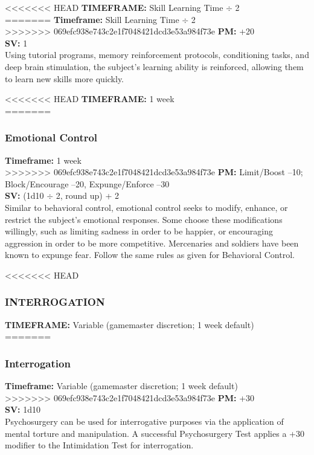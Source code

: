 <<<<<<< HEAD  \textbf{TIMEFRAME:} Skill Learning Time $\div$ 2 \\ =======  \textbf{Timeframe:} Skill Learning Time $\div$ 2 \\ >>>>>>> 069efc938e743c2e1f7048421dcd3e53a984f73e \textbf{PM:} +20 \\ \textbf{SV:} 1 \\ Using tutorial programs, memory reinforcement protocols, conditioning tasks, and deep brain stimulation, the subject’s learning ability is reinforced, allowing them to learn new skills more quickly. 

<<<<<<< HEAD  \textbf{TIMEFRAME:} 1 week \\ ======= \subsubsection{Emotional Control} \textbf{Timeframe:} 1 week \\ >>>>>>> 069efc938e743c2e1f7048421dcd3e53a984f73e \textbf{PM:} Limit/Boost –10; Block/Encourage –20, Expunge/Enforce –30 \\ \textbf{SV:} (1d10 $\div$ 2, round up) + 2 \\ Similar to behavioral control, emotional control seeks to modify, enhance, or restrict the subject’s emotional responses. Some choose these modifications willingly, such as limiting sadness in order to be happier, or encouraging aggression in order to be more competitive. Mercenaries and soldiers have been known to expunge fear. Follow the same rules as given for Behavioral Control. 



<<<<<<< HEAD \subsubsection{INTERROGATION} \textbf{TIMEFRAME:} Variable (gamemaster discretion; 1 week default) \\ ======= \subsubsection{Interrogation} \textbf{Timeframe:} Variable (gamemaster discretion; 1 week default) \\ >>>>>>> 069efc938e743c2e1f7048421dcd3e53a984f73e \textbf{PM:} +30 \\ \textbf{SV:} 1d10 \\ Psychosurgery can be used for interrogative purposes via the application of mental torture and manipulation. A successful Psychosurgery Test applies a +30 modifier to the Intimidation Test for interrogation. 

